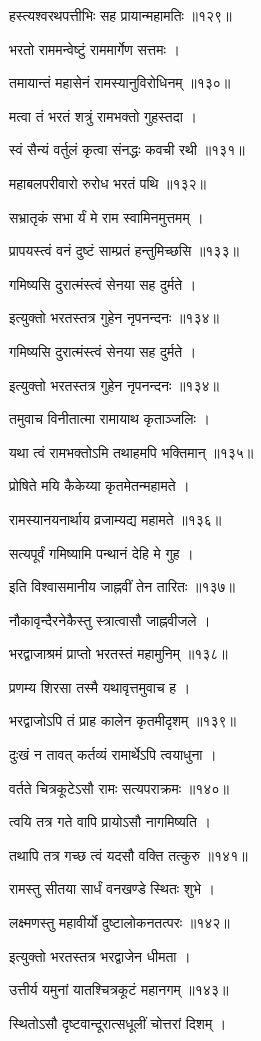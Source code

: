 हस्त्यश्वरथपत्तीभिः सह प्रायान्महामतिः ॥१२९॥

भरतो राममन्वेष्टुं राममार्गेण सत्तमः ।

तमायान्तं महासेनं रामस्यानुविरोधिनम् ॥१३०॥

मत्वा तं भरतं शत्रुं रामभक्तो गुहस्तदा ।

स्वं सैन्यं वर्तुलं कृत्वा संनद्धः कवची रथी ॥१३१॥

महाबलपरीवारो रुरोध भरतं पथि ॥१३२॥

सभ्रातृकं सभा र्यं मे राम स्वामिनमुत्तमम् ।

प्रापयस्त्वं वनं दुष्टं साम्प्रतं हन्तुमिच्छसि ॥१३३॥

गमिष्यसि दुरात्मंस्त्वं सेनया सह दुर्मते ।

इत्युक्तो भरतस्तत्र गुहेन नृपनन्दनः ॥१३४॥

गमिष्यसि दुरात्मंस्त्वं सेनया सह दुर्मते ।

इत्युक्तो भरतस्तत्र गुहेन नृपनन्दनः ॥१३४॥

तमुवाच विनीतात्मा रामायाथ कृताञ्जलिः ।

यथा त्वं रामभक्तोऽमि तथाहमपि भक्तिमान् ॥१३५॥

प्रोषिते मयि कैकेय्या कृतमेतन्महामते ।

रामस्यानयनार्थाय व्रजाम्यद्य महामते ॥१३६॥

सत्यपूर्वं गमिष्यामि पन्थानं देहि मे गुह ।

इति विश्वासमानीय जाह्नवीं तेन तारितः ॥१३७॥

नौकावृन्दैरनेकैस्तु स्त्रात्वासौ जाह्नवीजले ।

भरद्वाजाश्रमं प्राप्तो भरतस्तं महामुनिम् ॥१३८॥

प्रणम्य शिरसा तस्मै यथावृत्तमुवाच ह ।

भरद्वाजोऽपि तं प्राह कालेन कृतमीदृशम् ॥१३९॥

दुःखं न तावत् कर्तव्यं रामार्थेऽपि त्वयाधुना ।

वर्तते चित्रकूटेऽसौ रामः सत्यपराक्रमः ॥१४०॥

त्वयि तत्र गते वापि प्रायोऽसौ नागमिष्यति ।

तथापि तत्र गच्छ त्वं यदसौ वक्ति तत्कुरु ॥१४१॥

रामस्तु सीतया सार्धं वनखण्डे स्थितः शुभे ।

लक्ष्मणस्तु महावीर्यो दुष्टालोकनतत्परः ॥१४२॥

इत्युक्तो भरतस्तत्र भरद्वाजेन धीमता ।

उत्तीर्य यमुनां यातश्चित्रकूटं महानगम् ॥१४३॥

स्थितोऽसौ दृष्टवान्दूरात्सधूलीं चोत्तरां दिशम् ।

